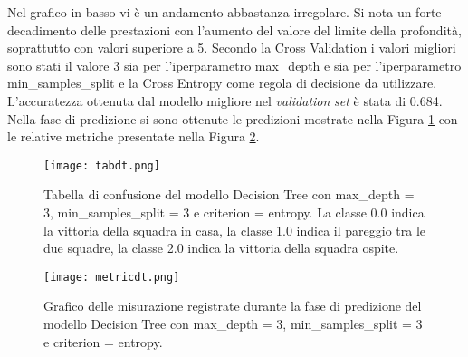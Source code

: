 Nel grafico in basso vi è un andamento abbastanza irregolare. Si nota un forte decadimento delle prestazioni con l'aumento del valore del limite della profondità, soprattutto con valori superiore a 5. Secondo la Cross Validation i valori migliori sono stati il valore 3 sia per l'iperparametro \textsf{max\_depth} e sia per l'iperparametro \textsf{min\_samples\_split} e la Cross Entropy come regola di decisione da utilizzare. L'accuratezza ottenuta dal modello migliore nel \emph{validation} \emph{set} è stata di 0.684.\\
Nella fase di predizione si sono ottenute le predizioni mostrate nella Figura \ref{fig:tabdt} con le relative metriche presentate nella Figura \ref{fig:dtmetrics}.
\begin{figure}[h]
	\begin{center}
		\texttt{[image: tabdt.png]}
		\caption{Tabella di confusione del modello Decision Tree con \textsf{max\_depth} = 3, \textsf{min\_samples\_split} = 3 e \textsf{criterion} = entropy. La classe 0.0 indica la vittoria della squadra in casa, la classe 1.0 indica il pareggio tra le due squadre, la classe 2.0 indica la vittoria della squadra ospite.
		} 
		\label{fig:tabdt}
	\end{center}
\end{figure}
\begin{figure}[]
	\begin{center}
		\texttt{[image: metricdt.png]}
		\caption{Grafico delle misurazione registrate durante la fase di predizione del modello Decision Tree con \textsf{max\_depth} = 3, \textsf{min\_samples\_split} = 3 e \textsf{criterion} = entropy.
		} 
		\label{fig:dtmetrics}
	\end{center}
\end{figure}
